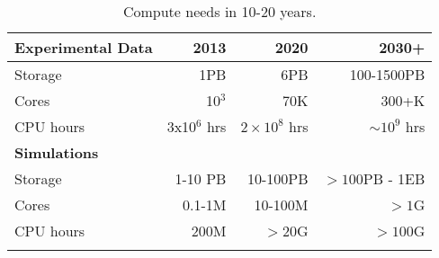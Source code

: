 \begin{center}
\begin{table}
\begin{tabular}{|l|r|r|r|} 
 \hline 
{\bf Experimental Data} & 2013 & 2020 & 2030+ \\
\hline
Storage & 1PB & 6PB & 100-1500PB \\
Cores & 10$^3$ & 70K & 300+K \\
CPU hours & 3x10$^6$ hrs & $2\times 10^8$ hrs & $\sim 10^9$ hrs \\
{\bf Simulations} &&& \\
Storage & 1-10 PB & 10-100PB & $> 100$PB - 1EB\\
Cores & 0.1-1M & 10-100M &$> 1$G\\
CPU hours & 200M & $>$20G & $> 100$G\\
\hline
\label{tab:CompNeeds}
\end{tabular}
\caption{Compute needs in 10-20 years.}
\end{table}
\end{center}




%
